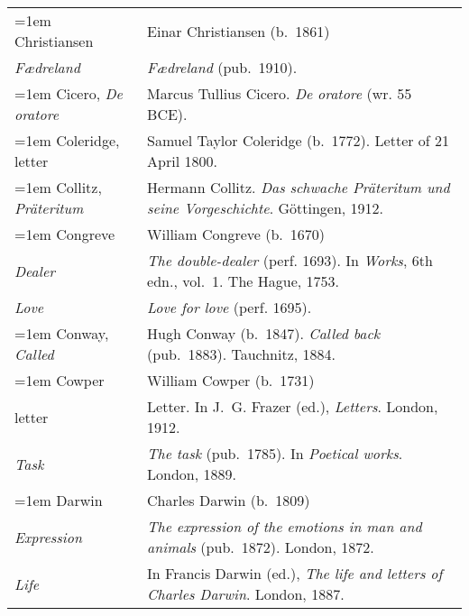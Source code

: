 \begin{xltabular}{\textwidth}{ lQ }
\hangindent=1em  Christiansen & Einar Christiansen (b.~1861)\\
\hspace{1em}\textit{Fædreland} & \textit{Fædreland} (pub.~1910).\\ %

\hangindent=1em  Cicero, \textit{De oratore} & Marcus Tullius Cicero. \textit{De oratore} (wr. 55 BCE). \\

\hangindent=1em  Coleridge, letter & Samuel Taylor Coleridge (b.~1772). Letter of 21 April 1800. \\

\hangindent=1em  Collitz, \textit{Präteritum} & Hermann Collitz. \textit{Das schwache Präteritum und seine Vorgeschichte}. Göttingen, 1912.\\

\hangindent=1em  Congreve & William Congreve (b.~1670) \\
\hspace{1em}\textit{Dealer} & \textit{The double-dealer} (perf. 1693). In \textit{Works}, 6th edn., vol.~1. The Hague, 1753.\\
\hspace{1em}\textit{Love} & \textit{Love for love} (perf. 1695). \\

\hangindent=1em  Conway, \textit{Called} & Hugh Conway (b.~1847). \textit{Called back} (pub.~1883). Tauchnitz, 1884.\\ 

\hangindent=1em  Cowper & William Cowper (b.~1731) \\
\hspace{1em}letter & Letter. In J.~G. Frazer (ed.), \textit{Letters}. London, 1912.\\ %
\hspace{1em}\textit{Task} & \textit{The task} (pub.~1785). In \textit{Poetical works}. London, 1889. \\

\hangindent=1em  Darwin & Charles Darwin (b.~1809) \\
\hspace{1em}\textit{Expression} & \textit{The expression of the emotions in man and animals} (pub.~1872). London, 1872. \\
\hspace{1em}\textit{Life} & In Francis Darwin (ed.), \textit{The life and letters of Charles Darwin}. London, 1887.  \\


\end{xltabular}
